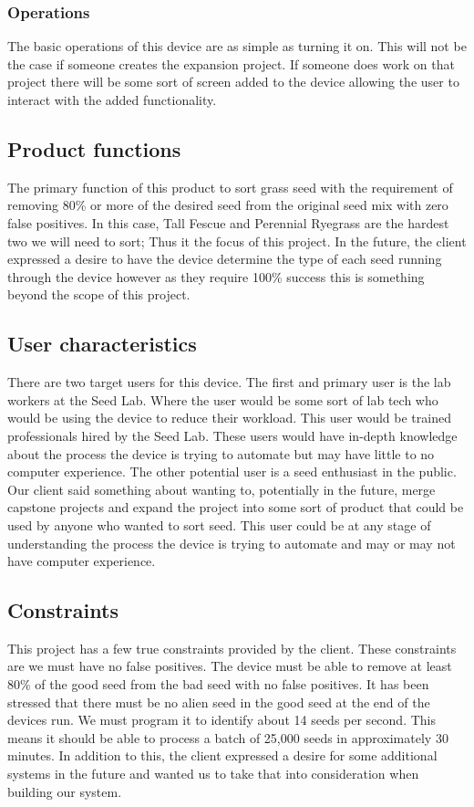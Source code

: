 \documentclass[onecolumn, draftclsnofoot,10pt, compsoc]{IEEEtran}
\begin{document}
\subsubsection{Operations}
The basic operations of this device are as simple as turning it on.
This will not be the case if someone creates the expansion project.
If someone does work on that project there will be some sort of screen added to the device allowing the user to interact with the added functionality.

\subsection{Product functions}
The primary function of this product to sort grass seed with the requirement of removing 80\% or more of the desired seed from the original seed mix with zero false positives.
In this case, Tall Fescue and Perennial Ryegrass are the hardest two we will need to sort; Thus it the focus of this project.
In the future, the client expressed a desire to have the device determine the type of each seed running through the device however as they require 100\% success this is something beyond the scope of this project.

\subsection{User characteristics}
There are two target users for this device.
The first and primary user is the lab workers at the Seed Lab.
Where the user would be some sort of lab tech who would be using the device to reduce their workload.
This user would be trained professionals hired by the Seed Lab.
These users would have in-depth knowledge about the process the device is trying to automate but may have little to no computer experience.
The other potential user is a seed enthusiast in the public.
Our client said something about wanting to, potentially in the future, merge capstone projects and expand the project into some sort of product that could be used by anyone who wanted to sort seed.
This user could be at any stage of understanding the process the device is trying to automate and may or may not have computer experience.

\subsection{Constraints}
This project has a few true constraints provided by the client.
These constraints are we must have no false positives.
The device must be able to remove at least 80\% of the good seed from the bad seed with no false positives.
It has been stressed that there must be no alien seed in the good seed at the end of the devices run.
We must program it to identify about 14 seeds per second.
This means it should be able to process a batch of 25,000 seeds in approximately 30 minutes.
In addition to this, the client expressed a desire for some additional systems in the future and wanted us to take that into consideration when building our system.
\end{document}
